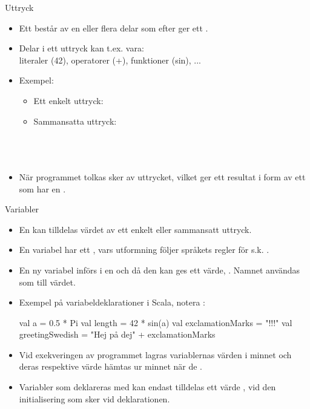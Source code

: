 \begin{Slide}{Uttryck}
\begin{itemize}
\item Ett  består av en eller flera delar som efter  ger ett .
\item Delar i ett uttryck kan t.ex. vara: \\ literaler (42), operatorer (+), funktioner (sin), ...
\item Exempel:
\begin{itemize}
\item Ett enkelt uttryck: \\ 
\item Sammansatta uttryck: \\
 \\
 \\
 \\
\end{itemize}

\item När programmet tolkas sker  av uttrycket, vilket ger ett resultat i form av ett  som har en .
\end{itemize}
\end{Slide}


\begin{Slide}{Variabler}\SlideFontSmall
\begin{itemize}
\item En  kan tilldelas värdet av ett enkelt eller sammansatt uttryck.
\item En variabel har ett , vars utformning följer språkets regler för s.k. .
\item En ny variabel införs i en  och då den kan ges ett värde, . Namnet användas som  till värdet.
\item Exempel på variabeldeklarationer i Scala, notera  :
\begin{Code}
val a = 0.5 * Pi
val length = 42 * sin(a)
val exclamationMarks = "!!!"
val greetingSwedish = "Hej på dej" + exclamationMarks
\end{Code}

\item Vid exekveringen av programmet lagras variablernas värden i minnet och deras respektive värde hämtas ur minnet när de .

\item Variabler som deklareras med  kan endast tilldelas ett värde , vid den initialisering som sker vid deklarationen.
\end{itemize}

\end{Slide}


